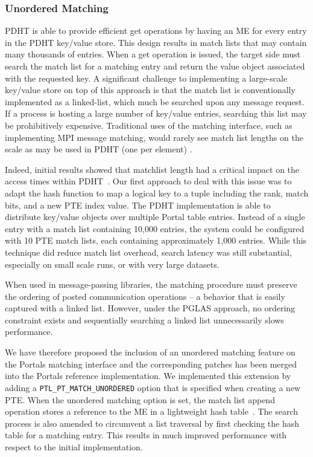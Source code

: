 \subsubsection{Unordered Matching}

PDHT is able to provide efficient get
operations by having an ME for every entry in the PDHT key/value store. This
design results in match lists that may contain many thousands of entries. When
a get operation is issued, the target side must search the match list for a
matching entry and return the value object associated with the requested key. A
significant challenge to implementing a large-scale key/value store on top of
this approach is that the match list is conventionally implemented as a
linked-list, which much be searched upon any message request. If a process is
hosting a large number of key/value entries, searching this list may be
prohibitively expensive. Traditional uses of the matching interface, such as
implementing MPI message matching, would rarely see match list lengths on the
scale as may be used in PDHT (one per element) \cite{flajslik:16}.

Indeed, initial results showed that matchlist length had a critical impact on
the access times within PDHT~\cite{comhpc16}. Our first approach to deal with
this issue was to adapt the hash function to map a logical key to a tuple
including the rank, match bits, and a new PTE index value. The PDHT
implementation is able to distribute key/value objects over multiple Portal
table entries. Instead of a single entry with a match list containing 10,000
entries, the system could be configured with 10 PTE match lists, each
containing approximately 1,000 entries. While this technique did reduce match
list overhead, search latency was still substantial, especially on small scale
runs, or with very large datasets.

When used in message-passing libraries, the matching procedure must preserve
the ordering of posted communication operations -- a behavior that is easily
captured with a linked list. However, under the PGLAS approach, no ordering
constraint exists and sequentially searching a linked list unnecessarily slows
performance.

\sloppypar
We have therefore proposed the inclusion of an unordered matching feature on the Portals matching interface
and the corresponding patches has been merged into the Portals reference implementation.
We implemented this extension by adding a {\tt PTL\_PT\_MATCH\_UNORDERED} option that is
specified when creating a new PTE. When the unordered matching option is set,
the match list append operation stores a reference to the ME in a lightweight
hash table~\cite{uthash}.  The search process is also amended to circumvent a
list traversal by first checking the hash table for a matching entry. This
results in much improved performance with respect to the initial
implementation.

